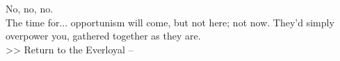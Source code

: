 No, no, no.\\

The time for... opportunism will come, but not here; not now. They’d simply overpower you, gathered together as they are.\\

>> Return to the Everloyal -- 
